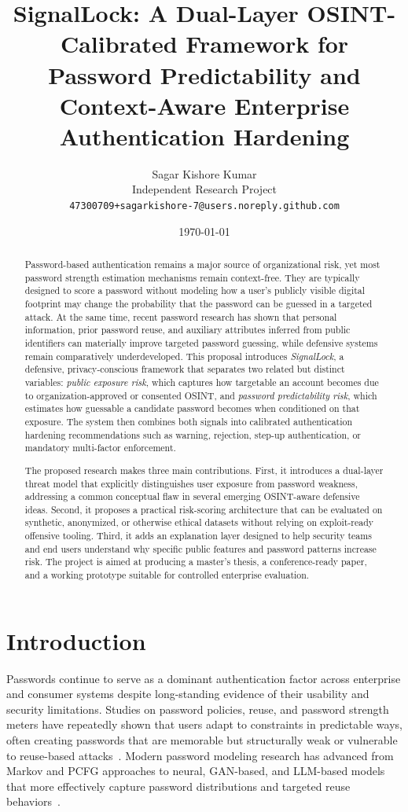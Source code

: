 \documentclass[11pt]{article}
\title{\textbf{SignalLock: A Dual-Layer OSINT-Calibrated Framework for Password Predictability and Context-Aware Enterprise Authentication Hardening}}
\author{Sagar Kishore Kumar \\
Independent Research Project \\
\texttt{47300709+sagarkishore-7@users.noreply.github.com}}
\date{\today}
\begin{document}
\maketitle
\onehalfspacing

\begin{abstract}
Password-based authentication remains a major source of organizational risk, yet most password strength estimation mechanisms remain context-free. They are typically designed to score a password without modeling how a user's publicly visible digital footprint may change the probability that the password can be guessed in a targeted attack. At the same time, recent password research has shown that personal information, prior password reuse, and auxiliary attributes inferred from public identifiers can materially improve targeted password guessing, while defensive systems remain comparatively underdeveloped. This proposal introduces \emph{SignalLock}, a defensive, privacy-conscious framework that separates two related but distinct variables: \emph{public exposure risk}, which captures how targetable an account becomes due to organization-approved or consented OSINT, and \emph{password predictability risk}, which estimates how guessable a candidate password becomes when conditioned on that exposure. The system then combines both signals into calibrated authentication hardening recommendations such as warning, rejection, step-up authentication, or mandatory multi-factor enforcement.

The proposed research makes three main contributions. First, it introduces a dual-layer threat model that explicitly distinguishes user exposure from password weakness, addressing a common conceptual flaw in several emerging OSINT-aware defensive ideas. Second, it proposes a practical risk-scoring architecture that can be evaluated on synthetic, anonymized, or otherwise ethical datasets without relying on exploit-ready offensive tooling. Third, it adds an explanation layer designed to help security teams and end users understand why specific public features and password patterns increase risk. The project is aimed at producing a master's thesis, a conference-ready paper, and a working prototype suitable for controlled enterprise evaluation.
\end{abstract}

\section{Introduction}
Passwords continue to serve as a dominant authentication factor across enterprise and consumer systems despite long-standing evidence of their usability and security limitations. Studies on password policies, reuse, and password strength meters have repeatedly shown that users adapt to constraints in predictable ways, often creating passwords that are memorable but structurally weak or vulnerable to reuse-based attacks~\cite{egelman2011passwords,habib2017blacklists,nistsp80063b}. Modern password modeling research has advanced from Markov and PCFG approaches to neural, GAN-based, and LLM-based models that more effectively capture password distributions and targeted reuse behaviors~\cite{weir2009pcfg,melicher2016neural,wheeler2016zxcvbn,passgpt2024,ptrguess2024}.
\end{document}
